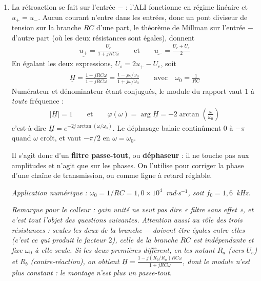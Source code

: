 \begin{correction}

\begin{enumerate}

	\item La rétroaction se fait sur l'entrée $-$ : l'ALI fonctionne en régime linéaire et $u_+=u_-$. Aucun courant n'entre dans les entrées, donc un pont diviseur de tension sur la branche $RC$ d'une part, le théorème de Millman sur l'entrée $-$ d'autre part (où les deux résistances sont égales), donnent
	\begin{align*}
		\underline{u_+}=\frac{\underline{U_e}}{1+jRC\omega}
		\qquad\text{et}\qquad
		\underline{u_-}=\frac{\underline{U_e}+\underline{U_s}}{2}
	\end{align*}
	En égalant les deux expressions, $\underline{U_s}=2\underline{u_+}-\underline{U_e}$, soit
	\begin{align*}
		\boxed{\underline{H}=\frac{1-jRC\omega}{1+jRC\omega}=\frac{1-j\omega/\omega_0}{1+j\omega/\omega_0}}
		\qquad\text{avec}\quad \omega_0=\frac{1}{RC}
	\end{align*}
	Numérateur et dénominateur étant conjugués, le module du rapport vaut $1$ à \textit{toute} fréquence :
	\begin{align*}
		|\underline{H}|=1 \qquad\text{et}\qquad \varphi(\omega)=\arg\underline{H}=-2\arctan\left(\frac{\omega}{\omega_0}\right)
	\end{align*}
	c'est-à-dire $\underline{H}=e^{-2j\arctan(\omega/\omega_0)}$. Le déphasage balaie continûment $0$ à $-\pi$ quand $\omega$ croît, et vaut $-\pi/2$ en $\omega=\omega_0$.

	Il s'agit donc d'un \textbf{filtre passe-tout}, ou \textbf{déphaseur} : il ne touche pas aux amplitudes et n'agit que sur les phases. On l'utilise pour corriger la phase d'une chaîne de transmission, ou comme ligne à retard réglable.

	\textit{Application numérique : $\omega_0=1/RC=1,0\times10^{4}$~rad$\cdot$s$^{-1}$, soit $f_0=1,6$~kHz.}

	\textit{Remarque pour le colleur : gain unité ne veut pas dire « filtre sans effet », et c'est tout l'objet des questions suivantes. Attention aussi au rôle des trois résistances : seules les deux de la branche $-$ doivent être égales entre elles (c'est ce qui produit le facteur $2$), celle de la branche $RC$ est indépendante et fixe $\omega_0$ à elle seule. Si les deux premières diffèrent, en les notant $R_a$ (vers $U_e$) et $R_b$ (contre-réaction), on obtient $\underline{H}=\frac{1-j(R_b/R_a)RC\omega}{1+jRC\omega}$, dont le module n'est plus constant : le montage n'est plus un passe-tout.}


\end{enumerate}
\end{correction}
